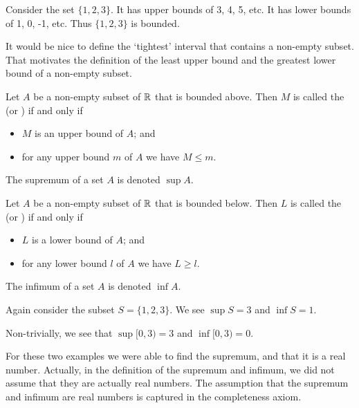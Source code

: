 \begin{example}
    Consider the set $\{1, 2, 3\}$. It has upper bounds of 3, 4, 5, etc. It has lower bounds of 1, 0, -1, etc. Thus $\{1, 2, 3\}$ is bounded.
\end{example}

It would be nice to define the `tightest' interval that contains a non-empty subset. That motivates the definition of the least upper bound and the greatest lower bound of a non-empty subset.

\begin{definition}
    Let $A$ be a non-empty subset of $\mathbb{R}$ that is bounded above. Then $M$ is called the  (or ) if and only if
    \begin{itemize}
        \item $M$ is an upper bound of $A$; and
        \item for any upper bound $m$ of $A$ we have $M \leq m$.
    \end{itemize}
    The supremum of a set $A$ is denoted $\sup A$.
\end{definition}

\begin{definition}
    Let $A$ be a non-empty subset of $\mathbb{R}$ that is bounded below. Then $L$ is called the  (or ) if and only if
    \begin{itemize}
        \item $L$ is a lower bound of $A$; and
        \item for any lower bound $l$ of $A$ we have $L \geq l$.
    \end{itemize}
    The infimum of a set $A$ is denoted $\inf A$.
\end{definition}

\begin{example}
    Again consider the subset $S = \{1, 2, 3\}$. We see $\sup S = 3$ and $\inf S = 1$.
\end{example}

\begin{example}
    Non-trivially, we see that $\sup [0, 3) = 3$ and $\inf [0, 3) = 0$.
\end{example}

For these two examples we were able to find the supremum, and that it is a real number. Actually, in the definition of the supremum and infimum, we did not assume that they are actually real numbers. The assumption that the supremum and infimum are real numbers is captured in the completeness axiom.

